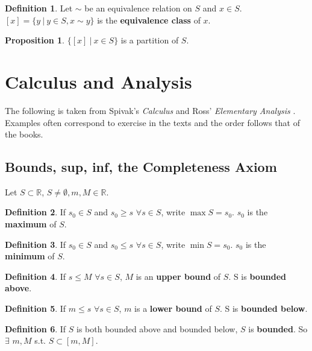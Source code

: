 \documentclass{article}
\theoremstyle{definition}
\newtheorem{definition}{Definition}[section]
\newtheorem{proposition}{Proposition}[section]
\begin{document}
\begin{definition}
Let $\sim$ be an equivalence relation on $S$ and $x \in S$. \\
$[x] = \{ y \ | \ y \in S, x \sim y\}$ is the \textbf{equivalence class} of $x$.
\end{definition}

\begin{proposition}
$\{[x] \ | \ x \in S \}$ is a partition of $S$.
\end{proposition}

\section{Calculus and Analysis}

The following is taken from Spivak's {\it Calculus} \cite{spivak} and Ross' {\it Elementary Analysis} \cite{ross}. Examples often correspond to exercise in the texts and the order follows that of the books.

\subsection{Bounds, sup, inf, the Completeness Axiom}

Let $S \subset \mathbb{R}$, $S \neq \emptyset, m, M \in \mathbb{R}$. 

\begin{definition}
If $s_0 \in S$ and $s_0 \ge s$ $\forall s \in S$, write $\max S = s_0$. $s_0$ is the \textbf{maximum} of $S$.
\end{definition}

\begin{definition}
If $s_0 \in S$ and $s_0 \le s$ $\forall s \in S$, write $\min S = s_0$. $s_0$ is the \textbf{minimum} of $S$.
\end{definition}

\begin{definition}
If $s \leq M$ $\forall s \in S$, $M$ is an \textbf{upper bound} of $S$. S is \textbf{bounded above}.
\end{definition}

\begin{definition}
If $m \leq s$ $\forall s \in S$, $m$ is a \textbf{lower bound} of $S$. S is \textbf{bounded below}.
\end{definition}

\begin{definition}
If $S$ is both bounded above and bounded below, $S$ is \textbf{bounded}. So $\exists$ $m, M$ s.t. $S \subset [m, M]$.
\end{definition}
\end{document}

